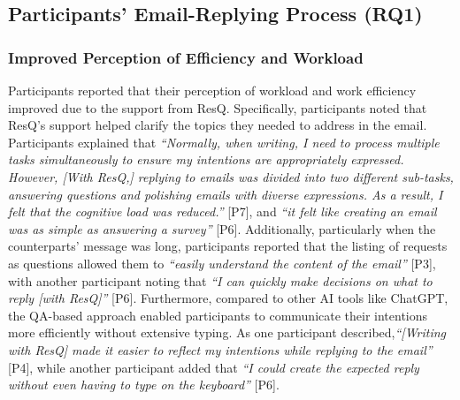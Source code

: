 
\subsection{Participants' Email-Replying Process (RQ1)}
\subsubsection{Improved Perception of Efficiency and Workload}
\label{sec:result2_efficiency}
Participants reported that their perception of workload and work efficiency improved due to the support from ResQ.
Specifically, participants noted that ResQ's support helped clarify the topics they needed to address in the email. 
Participants explained that \textit{``Normally, when writing, I need to process multiple tasks simultaneously to ensure my intentions are appropriately expressed. However, [With ResQ,] replying to emails was divided into two different sub-tasks, answering questions and polishing emails with diverse expressions. As a result, I felt that the cognitive load was reduced.''} [P7], and \textit{``it felt like creating an email was as simple as answering a survey''} [P6].
Additionally, particularly when the counterparts' message was long, participants reported that the listing of requests as questions allowed them to \textit{``easily understand the content of the email''} [P3], with another participant noting that \textit{``I can quickly make decisions on what to reply [with ResQ]''} [P6]. 
Furthermore, compared to other AI tools like ChatGPT, the QA-based approach enabled participants to communicate their intentions more efficiently without extensive typing.
As one participant described,\textit{``[Writing with ResQ] made it easier to reflect my intentions while replying to the email''} [P4], while another participant added that \textit{``I could create the expected reply without even having to type on the keyboard''} [P6].
